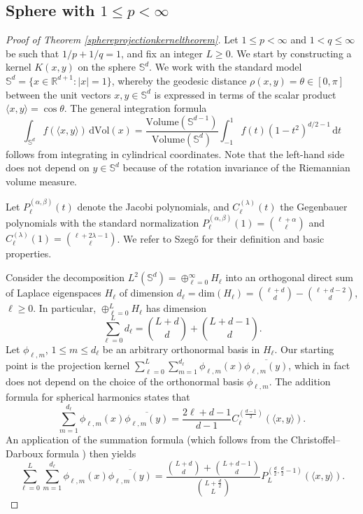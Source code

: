 \documentclass[11pt,a4paper]{article}
\theoremstyle{definition}
\begin{document}
\subsection{Sphere with $1 \le p < \infty$}

\begin{proof}[Proof of Theorem \ref{sphereprojectionkerneltheorem}] Let $1 \le p < \infty$ and $1<q \le \infty$ be such that $1/p+1/q=1$, and fix an integer $L \ge 0$. We start by constructing a kernel $K(x,y)$ on the sphere $\mathbb{S}^d$. We work with the standard model $\mathbb{S}^d=\{ x \in \mathbb{R}^{d+1} : |x|=1 \}$, whereby the geodesic distance $\rho(x,y)=\theta \in [0,\pi]$ between the unit vectors $x,y \in \mathbb{S}^d$ is expressed in terms of the scalar product $\langle x,y \rangle = \cos \theta$. The general integration formula
\begin{equation}\label{sphereintegration}
\int_{\mathbb{S}^d} f(\langle x,y \rangle) \, \mathrm{d}\mathrm{Vol}(x) =\frac{\mathrm{Volume}(\mathbb{S}^{d-1})}{\mathrm{Volume}(\mathbb{S}^{d})} \int_{-1}^1 f(t) (1-t^2)^{d/2-1} \, \mathrm{d}t
\end{equation}
follows from integrating in cylindrical coordinates. Note that the left-hand side does not depend on $y \in \mathbb{S}^d$ because of the rotation invariance of the Riemannian volume measure.

Let $P_{\ell}^{(\alpha, \beta)}(t)$ denote the Jacobi polynomials, and $C_{\ell}^{(\lambda)}(t)$ the Gegenbauer polynomials with the standard normalization $P_{\ell}^{(\alpha, \beta)}(1)=\binom{\ell+\alpha}{\ell}$ and $C_{\ell}^{(\lambda)} (1)=\binom{\ell+2\lambda-1}{\ell}$. We refer to Szeg\H{o} \cite{SZ} for their definition and basic properties.

Consider the decomposition $L^2(\mathbb{S}^d)=\oplus_{\ell=0}^{\infty} H_{\ell}$ into an orthogonal direct sum of Laplace eigenspaces $H_{\ell}$ of dimension $d_{\ell} = \mathrm{dim}(H_{\ell})= \binom{\ell+d}{d} - \binom{\ell+d-2}{d}$, $\ell \ge 0$. In particular, $\oplus_{\ell=0}^L H_{\ell}$ has dimension
\[ \sum_{\ell=0}^L d_{\ell} = \binom{L+d}{d} + \binom{L+d-1}{d} . \]
Let $\phi_{\ell,m}$, $1 \le m \le d_{\ell}$ be an arbitrary orthonormal basis in $H_{\ell}$. Our starting point is the projection kernel $\sum_{\ell=0}^L \sum_{m=1}^{d_{\ell}} \phi_{\ell,m}(x) \overline{\phi_{\ell,m}(y)}$, which in fact does not depend on the choice of the orthonormal basis $\phi_{\ell,m}$. The addition formula for spherical harmonics states that
\begin{equation}\label{additiongegenbauer}
\sum_{m=1}^{d_{\ell}} \phi_{\ell,m}(x) \overline{\phi_{\ell,m}(y)} = \frac{2 \ell +d-1}{d-1} C_{\ell}^{(\frac{d-1}{2})} (\langle x, y \rangle) .
\end{equation}
An application of the summation formula \cite[p.\ 71, Equation (4.5.3)]{SZ} (which follows from the Christoffel--Darboux formula \cite[p.\ 43, Theorem 3.2.2]{SZ}) then yields
\begin{equation}\label{projectionkernel}
\sum_{\ell=0}^L \sum_{m=1}^{d_{\ell}} \phi_{\ell,m}(x) \overline{\phi_{\ell,m}(y)} = \frac{\binom{L+d}{d} + \binom{L+d-1}{d}}{\binom{L+\frac{d}{2}}{L}} P_L^{(\frac{d}{2}, \frac{d}{2}-1)} (\langle x,y \rangle) .
\end{equation}


\end{proof}
\end{document}
